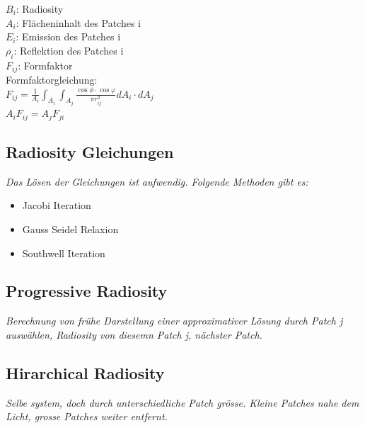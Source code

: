 $B_i$: Radiosity\\
$A_i$: Flächeninhalt des Patches i\\
$E_i$: Emission des Patches i\\
$\rho_i$: Reflektion des Patches i\\
$F_{ij}$: Formfaktor\\

Formfaktorgleichung:\\
$F_{ij} = \frac{1}{A_i}\int_{A_i} \int_{A_j} \frac{\cos \phi \cdot \cos \varphi}{\pi r_{ij}^2} dA_i \cdot dA_j$\\
$A_iF_{ij} = A_jF_{ji}$

\subsection{Radiosity Gleichungen}

\textit{Das Lösen der Gleichungen ist aufwendig. Folgende Methoden gibt es:}

\begin{itemize}
    \item Jacobi Iteration
    \item Gauss Seidel Relaxion
    \item Southwell Iteration
\end{itemize}

\subsection{Progressive Radiosity}

\textit{Berechnung von frühe Darstellung einer approximativer Lösung durch
Patch j auswählen, Radiosity von diesemn Patch j, nächster Patch.}

\subsection{Hirarchical Radiosity}

\textit{Selbe system, doch durch unterschiedliche Patch grösse. Kleine Patches
nahe dem Licht, grosse Patches weiter entfernt.}